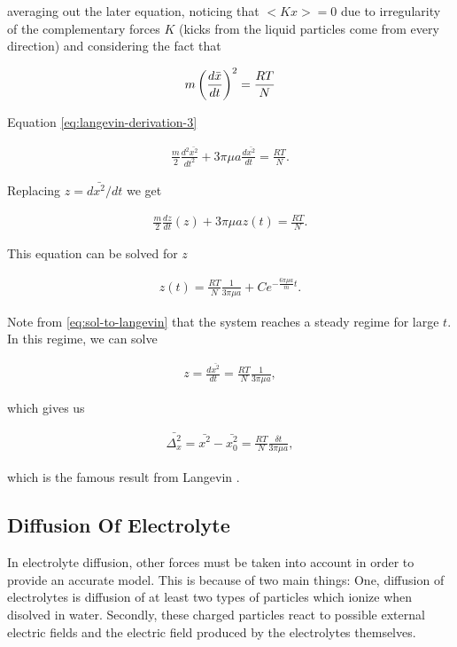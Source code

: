 averaging out the later equation, noticing that $<Kx> = 0$ due to irregularity of the complementary forces $K$ (kicks from the liquid particles come from every direction) and considering the fact that

\begin{align}
	m\left({\frac{d \bar{x}}{dt}}\right)^2 = \frac{RT}{N}
\end{align}

Equation \ref{eq:langevin-derivation-3}

\begin{align}
	\frac{m}{2}\frac{d^2\bar{x^2}}{dt^2} + 3\pi\mu a \frac{d \bar{x^2}}{dt} = \frac{RT}{N}.
\end{align}

Replacing $z = d\bar{x^2}/dt$ we get

\begin{align}
	\frac{m}{2}\frac{dz}{dt}(z) + 3\pi\mu a z(t) = \frac{RT}{N}.
\end{align}

This equation can be solved for $z$

\begin{align}
	\label{eq:sol-to-langevin}
	z(t) = \frac{RT}{N}\frac{1}{3\pi\mu a} + Ce^{-\frac{6\pi\mu a}{m}t}.
\end{align}

Note from \ref{eq:sol-to-langevin} that the system reaches a steady regime for large $t$. In this regime, we can solve

\begin{align}
	z = \frac{d \bar{x^2}}{dt} =  \frac{RT}{N}\frac{1}{3\pi\mu a},
\end{align}

which gives us

\begin{align}
	\bar{\Delta_x^2} = \bar{x^2} - \bar{x_0^2} =  \frac{RT}{N}\frac{\delta t}{3\pi\mu a},
\end{align}

which is the famous result from Langevin \cite{langevin_original}.

\cite{deen}


\subsection{Diffusion Of Electrolyte}

In electrolyte diffusion, other forces must be taken into account in order to provide an accurate model. This is because of two main things: One, diffusion of electrolytes is diffusion of at least two types of particles which ionize when disolved in water. Secondly, these charged particles react to possible external electric fields and the electric field produced by the electrolytes themselves.

